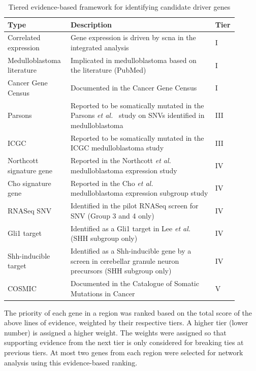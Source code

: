 \begin{table}[H]
	\caption[Tiered evidence-based framework for identifying candidate driver genes]
	{
		Tiered evidence-based framework for identifying candidate driver genes
	}
	\label{tab:driver-evidence}
	\scriptsize
	\setlength{\extrarowheight}{0.5em}
	\centering
	\begin{tabular}{ p{0.25\linewidth} | p{0.6\linewidth} | p{0.05\linewidth} }
		\hline
		\textbf{Type} & \textbf{Description} & \textbf{Tier} \\
		\hline
		Correlated expression & Gene expression is driven by \gls{scna} in the integrated analysis & I \\
		Medulloblastoma literature & Implicated in medulloblastoma based on the literature (PubMed) & I \\
		Cancer Gene Census & Documented in the Cancer Gene Census & I \\
		Parsons & Reported to be somatically mutated in the Parsons \emph{et al.}\ \citeref{parsons11} study on SNVs identified in medulloblastoma & III \\
		ICGC & Reported to be somatically mutated in the ICGC medulloblastoma study & III \\
		Northcott signature gene & Reported in the Northcott \emph{et al.}\ \citeref{northcott11a} medulloblastoma expression study & IV \\
		Cho signature gene & Reported in the Cho \emph{et al.}\ \citeref{cho11} medulloblastoma expression subgroup study & IV \\
		RNASeq SNV & Identified in the pilot RNASeq screen for SNV (Group 3 and 4 only) & IV \\
		Gli1 target & Identified as a Gli1 target in Lee \emph{et al.}\ \citeref{lee10} (SHH subgroup only) & IV \\
		Shh-inducible target & Identified as a Shh-inducible gene by a screen in cerebellar granule neuron precursors (SHH subgroup only) & IV \\
		COSMIC & Documented in the Catalogue of Somatic Mutations in Cancer & V \\
		\hline
	\end{tabular}
\end{table}

The priority of each gene in a region was ranked based on the total score of the above lines of evidence, weighted by their respective tiers. A higher tier (lower number) is assigned a higher weight. The weights were assigned so that supporting evidence from the next tier is only considered for breaking ties at previous tiers. At most two genes from each region were selected for network analysis using this evidence-based ranking.

